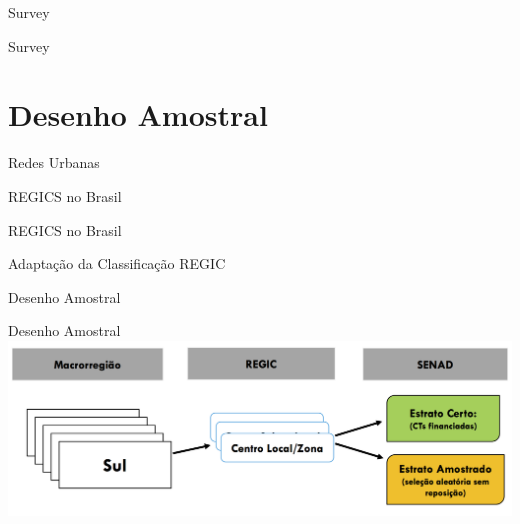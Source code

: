 \begin{frame}{Survey}

\end{frame}


\begin{frame}{Survey}

\end{frame}


\section{Desenho Amostral}

\begin{frame}{Redes Urbanas}

\end{frame}


\begin{frame}{REGICS no Brasil}

\end{frame}

\begin{frame}{REGICS no Brasil}

\end{frame}

\begin{frame}{Adaptação da Classificação REGIC}

\end{frame}


\begin{frame}{Desenho Amostral}

\end{frame}



\begin{frame}{Desenho Amostral}
\centering
\includegraphics[width=1\textwidth, keepaspectratio]{figures/desenho.png}
\end{frame}



